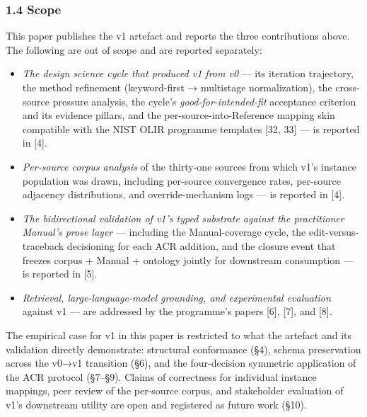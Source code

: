 \documentclass[
]{article}
\providecommand{\tightlist}{%
  \setlength{\itemsep}{0pt}\setlength{\parskip}{0pt}}
\begin{document}
\subsubsection{1.4 Scope}\label{scope}

This paper publishes the v1 artefact and reports the three contributions
above. The following are out of scope and are reported separately:

\begin{itemize}
\tightlist
\item
  \emph{The design science cycle that produced v1 from v0} --- its
  iteration trajectory, the method refinement (keyword-first →
  multistage normalization), the cross-source pressure analysis, the
  cycle's \emph{good-for-intended-fit} acceptance criterion and its
  evidence pillars, and the per-source-into-Reference mapping skin
  compatible with the NIST OLIR programme templates {[}32, 33{]} --- is
  reported in {[}4{]}.
\item
  \emph{Per-source corpus analysis} of the thirty-one sources from which
  v1's instance population was drawn, including per-source convergence
  rates, per-source adjacency distributions, and override-mechanism logs
  --- is reported in {[}4{]}.
\item
  \emph{The bidirectional validation of v1's typed substrate against the
  practitioner Manual's prose layer} --- including the Manual-coverage
  cycle, the edit-versus-traceback decisioning for each ACR addition,
  and the closure event that freezes corpus + Manual + ontology jointly
  for downstream consumption --- is reported in {[}5{]}.
\item
  \emph{Retrieval, large-language-model grounding, and experimental
  evaluation} against v1 --- are addressed by the programme's papers
  {[}6{]}, {[}7{]}, and {[}8{]}.
\end{itemize}

The empirical case for v1 in this paper is restricted to what the
artefact and its validation directly demonstrate: structural conformance
(§4), schema preservation across the v0→v1 transition (§6), and the
four-decision symmetric application of the ACR protocol (§7--§9). Claims
of correctness for individual instance mappings, peer review of the
per-source corpus, and stakeholder evaluation of v1's downstream utility
are open and registered as future work (§10).
\end{document}
